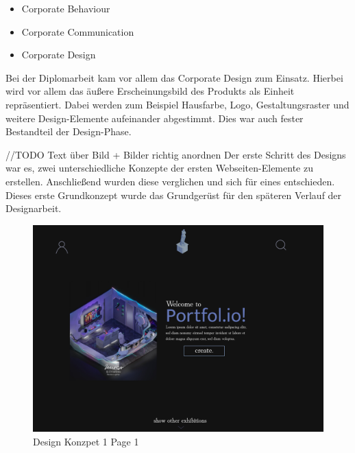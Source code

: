 \begin{itemize}
    \item Corporate Behaviour
    \item Corporate Communication
    \item Corporate Design
\end{itemize}
\cite{CorporateIdentity}

Bei der Diplomarbeit kam vor allem das Corporate Design zum Einsatz. Hierbei wird vor allem das äußere Erscheinungsbild des Produkts als Einheit repräsentiert. Dabei werden zum Beispiel Hausfarbe, Logo, Gestaltungsraster und weitere Design-Elemente aufeinander abgestimmt. Dies war auch fester Bestandteil der Design-Phase.
\cite{CorporateDesign}

//TODO Text über Bild + Bilder richtig anordnen
Der erste Schritt des Designs war es, zwei unterschiedliche Konzepte der ersten Webseiten-Elemente zu erstellen. Anschließend wurden diese verglichen und sich für eines entschieden. Dieses erste Grundkonzept wurde das Grundgerüst für den späteren Verlauf der Designarbeit.

\begin{figure}
    \centering
    \includegraphics[scale=0.3]{pics/DesignKonzept1_1.png}
    \caption{Design Konzpet 1 Page 1}
\end{figure}

